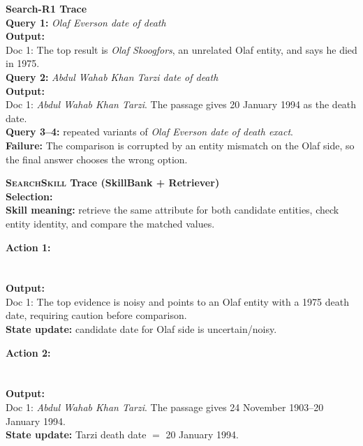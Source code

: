 \documentclass{article}
\newcommand{\Ours}{\textsc{SearchSkill}\xspace}
\begin{document}
\casedash
\noindent\textcolor{red!75!black}{\textbf{Search-R1 Trace}}\\
\textbf{Query 1:} \emph{Olaf Everson date of death}\\
\textbf{Output:}\\
Doc 1: The top result is \emph{Olaf Skoogfors}, an unrelated Olaf entity, and says he died in 1975.\\
\textbf{Query 2:} \emph{Abdul Wahab Khan Tarzi date of death}\\
\textbf{Output:}\\
Doc 1: \emph{Abdul Wahab Khan Tarzi}. The passage gives 20 January 1994 as the death date.\\
\textbf{Query 3--4:} repeated variants of \emph{Olaf Everson date of death exact}.\\
\textbf{Failure:} The comparison is corrupted by an entity mismatch on the Olaf side, so the final answer chooses the wrong option.

\casedash
\noindent\textcolor{blue!75!black}{\textbf{\Ours Trace (SkillBank + Retriever)}}\\
\textbf{Selection:} \\
\textbf{Skill meaning:} retrieve the same attribute for both candidate entities, check entity identity, and compare the matched values.

\textbf{Action 1:}\\
\\
\\
\textbf{Output:}\\
Doc 1: The top evidence is noisy and points to an Olaf entity with a 1975 death date, requiring caution before comparison.\\
\textbf{State update:} candidate date for Olaf side is uncertain/noisy.

\textbf{Action 2:}\\
\\
\\
\textbf{Output:}\\
Doc 1: \emph{Abdul Wahab Khan Tarzi}. The passage gives 24 November 1903--20 January 1994.\\
\textbf{State update:} Tarzi death date \(=\) 20 January 1994.
\end{document}
